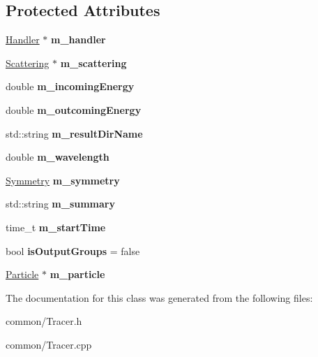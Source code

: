 \subsection*{Protected Attributes}
\begin{DoxyCompactItemize}
\item 
\mbox{\label{class_tracer_af655d478c9abc81008b06ff236854fc5}} 
\mbox{\hyperlink{class_handler}{Handler}} $\ast$ {\bfseries m\+\_\+handler}
\item 
\mbox{\label{class_tracer_a67c34aa36cbd336bc0c5f984428b3859}} 
\mbox{\hyperlink{class_scattering}{Scattering}} $\ast$ {\bfseries m\+\_\+scattering}
\item 
\mbox{\label{class_tracer_ab3756356e40ed07a654df3935b7531ab}} 
double {\bfseries m\+\_\+incoming\+Energy}
\item 
\mbox{\label{class_tracer_a29d72e7162606a3d6dbba00c50e61ce9}} 
double {\bfseries m\+\_\+outcoming\+Energy}
\item 
\mbox{\label{class_tracer_ac0e7ebee01337d820acd883f19b7c26f}} 
std\+::string {\bfseries m\+\_\+result\+Dir\+Name}
\item 
\mbox{\label{class_tracer_a08936f3fe9cd42c0d5eab497c701fb68}} 
double {\bfseries m\+\_\+wavelength}
\item 
\mbox{\label{class_tracer_ad385e51055f6465868bbdd1e2bdba13b}} 
\mbox{\hyperlink{class_orientation}{Symmetry}} {\bfseries m\+\_\+symmetry}
\item 
\mbox{\label{class_tracer_a051998c8471ebe0a0a26823b5f21f31c}} 
std\+::string {\bfseries m\+\_\+summary}
\item 
\mbox{\label{class_tracer_ae2a7b9e6e60693099fffbccca7a1dea6}} 
time\+\_\+t {\bfseries m\+\_\+start\+Time}
\item 
\mbox{\label{class_tracer_a5bb5e8c120182d824c89738f185065e5}} 
bool {\bfseries is\+Output\+Groups} = false
\item 
\mbox{\label{class_tracer_a1053837fa4c97fdeec8ea4397921209e}} 
\mbox{\hyperlink{class_particle}{Particle}} $\ast$ {\bfseries m\+\_\+particle}
\end{DoxyCompactItemize}


The documentation for this class was generated from the following files\+:\begin{DoxyCompactItemize}
\item 
common/Tracer.\+h\item 
common/Tracer.\+cpp\end{DoxyCompactItemize}
